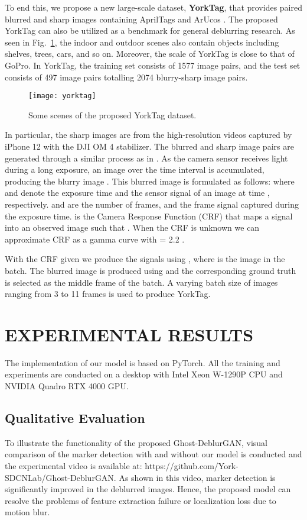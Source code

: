 \documentclass[letterpaper, 10 pt, conference]{ieeeconf}
\begin{document}
To end this, we propose a new large-scale dataset, \textbf{YorkTag}, that provides paired blurred and sharp images containing AprilTags \cite{ap3} and ArUcos \cite{aruco}. The proposed YorkTag can also be utilized as a benchmark for general deblurring research. As seen in Fig.~\ref{yorktag}, the indoor and outdoor scenes also contain objects including shelves, trees, cars, and so on. Moreover, the scale of YorkTag is close to that of GoPro. In YorkTag, the training set consists of 1577 image pairs, and the test set consists of 497 image pairs totalling 2074 blurry-sharp image pairs. 
\begin{figure}[thpb]
	\centering
	\texttt{[image: yorktag]}
	\caption{Some scenes of the proposed YorkTag dataset.}
	\label{yorktag}
\end{figure}

In particular, the sharp images are from the high-resolution videos captured by iPhone 12 with the DJI OM 4 stabilizer. The blurred and sharp image pairs are generated through a similar process as in \cite{nah}. As the camera sensor receives light during a long exposure, an image over the time interval is accumulated, producing the blurry image \cite{blurgen}. This blurred image  is formulated as follows:
where  and   denote the exposure time and the sensor signal of an image at time , respectively.  and  are the number of frames, and the  frame signal captured during the exposure time.  is the Camera Response Function  (CRF) that maps a signal  into an observed image  such that . When the CRF is unknown we can approximate CRF as a gamma curve with = 2.2 \cite{CRF}.

With the CRF given we produce the signals  using , where  is the  image in the batch. The blurred image is produced using  and the corresponding ground truth is selected as the middle frame of the batch. A varying batch size of images ranging from 3 to 11 frames is used to produce YorkTag.



\section{EXPERIMENTAL RESULTS}\label{exp}

The implementation of our model is based on PyTorch. All the training and experiments are conducted on a desktop with Intel Xeon W-1290P CPU and NVIDIA Quadro RTX 4000 GPU.


\subsection{Qualitative Evaluation}
To illustrate the functionality of the proposed Ghost-DeblurGAN, visual comparison of the marker detection with and without our model is conducted and the experimental video is available at: https://github.com/York-SDCNLab/Ghost-DeblurGAN. As shown in this video, marker detection is significantly improved in the deblurred images. Hence, the proposed model can resolve the problems of feature extraction failure or localization loss due to motion blur.
\end{document}
